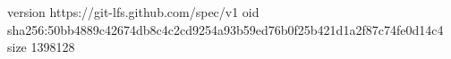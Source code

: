 version https://git-lfs.github.com/spec/v1
oid sha256:50bb4889c42674db8c4c2cd9254a93b59ed76b0f25b421d1a2f87c74fe0d14c4
size 1398128
